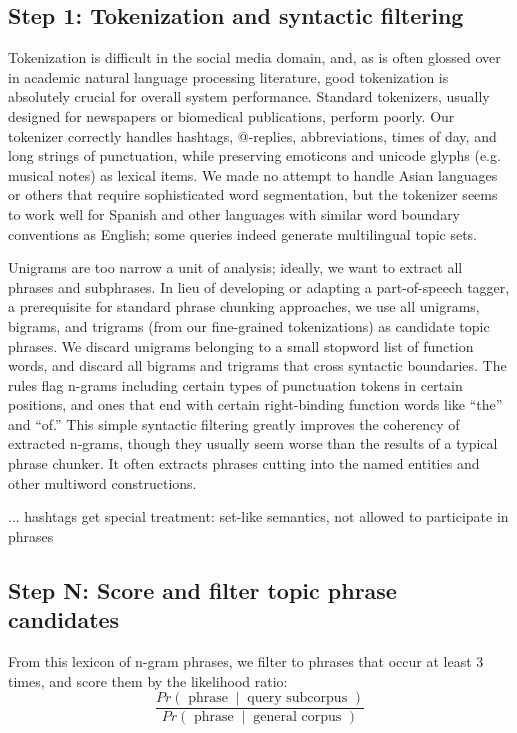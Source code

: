 \documentclass[letterpaper]{article}
\newcommand{\codenote}[1]{}
\begin{document}
\subsection{Step 1: Tokenization and syntactic filtering}

Tokenization is difficult in the social media domain, and, as is often glossed over in academic natural language processing literature, good tokenization is absolutely crucial for overall system performance.  Standard tokenizers, usually designed for newspapers or biomedical publications, perform poorly.  Our tokenizer correctly handles hashtags, @-replies, abbreviations, times of day, and long strings of punctuation, while preserving emoticons and unicode glyphs (e.g. musical notes) as lexical items.  We made no attempt to handle Asian languages or others that require sophisticated word segmentation, but the tokenizer seems to work well for Spanish and other languages with similar word boundary conventions as English; some queries indeed generate multilingual topic sets.

Unigrams are too narrow a unit of analysis; ideally, we want to extract all phrases and subphrases.  In lieu of developing or adapting a part-of-speech tagger, a prerequisite for standard phrase chunking approaches, we use all unigrams, bigrams, and trigrams (from our fine-grained tokenizations) as candidate topic phrases.  We discard unigrams belonging to a small stopword list of function words, and discard all bigrams and trigrams that cross syntactic boundaries. The rules flag n-grams including certain types of punctuation tokens in certain positions, and ones that end with certain right-binding function words like ``the'' and ``of.''  This simple syntactic filtering greatly improves the coherency of extracted n-grams, though they usually seem worse than the results of a typical phrase chunker.  It often extracts phrases cutting into the named entities and other multiword constructions.

... hashtags get special treatment: set-like semantics, not allowed to participate in phrases

\subsection{Step N: Score and filter topic phrase candidates}

\codenote{lang_model.py, ranking.py}
From this lexicon of n-gram phrases, we filter to phrases that occur at least 3 times, and score them by the likelihood ratio:
\[\frac{Pr(\textrm{ phrase } \ |\ \textrm{ query subcorpus })}
{Pr(\textrm{ phrase } \ |\ \textrm{ general corpus })}
\]
\end{document}
